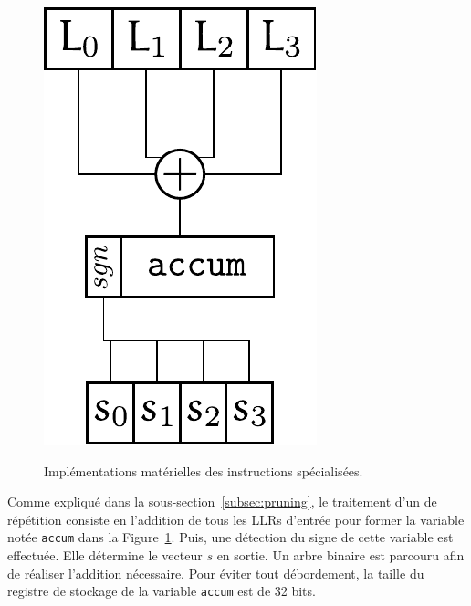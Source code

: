 \begin{figure}[t]
{  \includegraphics[scale=0.45]{main/ch3_fig/rep_tie}
  \label{fig:rep_tie}
  } \quad\quad\quad\quad\quad\quad\quad\quad\quad\quad
  \caption{Implémentations matérielles des instructions spécialisées.}
\end{figure}

Comme expliqué dans la sous-section~\ref{subsec:pruning}, le traitement d'un \noeud de répétition consiste en l'addition de tous les LLRs d'entrée pour former la variable notée \og \texttt{accum} \fg dans la Figure~\ref{fig:rep_tie}. Puis, une détection du signe de cette variable est effectuée. Elle détermine le vecteur $s$ en sortie. Un arbre binaire est parcouru afin de réaliser l'addition nécessaire. Pour éviter tout débordement, la taille du registre de stockage de la variable \texttt{accum} est de 32 bits.

